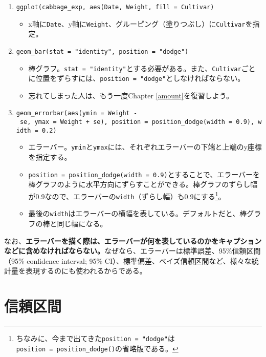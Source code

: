 \documentclass[]{book}
\providecommand{\tightlist}{%
  \setlength{\itemsep}{0pt}\setlength{\parskip}{0pt}}
\let\rmarkdownfootnote\footnote%
\def\footnote{\protect\rmarkdownfootnote}
\begin{document}
\begin{enumerate}
\def\labelenumi{\arabic{enumi}.}
\setcounter{enumi}{-1}
\item
  \texttt{ggplot(cabbage\_exp,\ aes(Date,\ Weight,\ fill\ =\ Cultivar)}

  \begin{itemize}
  \tightlist
  \item
    x軸に\texttt{Date}、y軸に\texttt{Weight}、グルーピング（塗りつぶし）に\texttt{Cultivar}を指定。
  \end{itemize}
\item
  \texttt{geom\_bar(stat\ =\ "identity",\ position\ =\ "dodge")}

  \begin{itemize}
  \item
    棒グラフ。\texttt{stat\ =\ "identity"}とする必要がある。また、\texttt{Cultivar}ごとに位置をずらすには、\texttt{position\ =\ "dodge"}としなければならない。
  \item
    忘れてしまった人は、もう一度Chapter \ref{amount}を復習しよう。
  \end{itemize}
\item
  \texttt{geom\_errorbar(aes(ymin\ =\ Weight\ -\ se,\ ymax\ =\ Weight\ +\ se),\ position\ =\ position\_dodge(width\ =\ 0.9),\ width\ =\ 0.2)}

  \begin{itemize}
  \item
    エラーバー。\texttt{ymin}と\texttt{ymax}には、それぞれエラーバーの下端と上端のy座標を指定する。
  \item
    \texttt{position\ =\ position\_dodge(width\ =\ 0.9)}とすることで、エラーバーを棒グラフのように水平方向にずらすことができる。棒グラフのずらし幅が0.9なので、エラーバーの\texttt{width}（ずらし幅）も0.9にする\footnote{ちなみに、今まで出てきた\texttt{position\ =\ "dodge"}は\texttt{position\ =\ position\_dodge()}の省略版である。}。
  \item
    最後の\texttt{width}はエラーバーの横幅を表している。デフォルトだと、棒グラフの棒と同じ幅になる。
  \end{itemize}
\end{enumerate}

なお、\textbf{エラーバーを描く際は、エラーバーが何を表しているのかをキャプションなどに含めなければならない。}なぜなら、エラーバーは標準誤差、95\%信頼区間（95\%
confidence interval; 95\%
CI）、標準偏差、ベイズ信頼区間など、様々な統計量を表現するのにも使われるからである。

\section{信頼区間}
\end{document}
